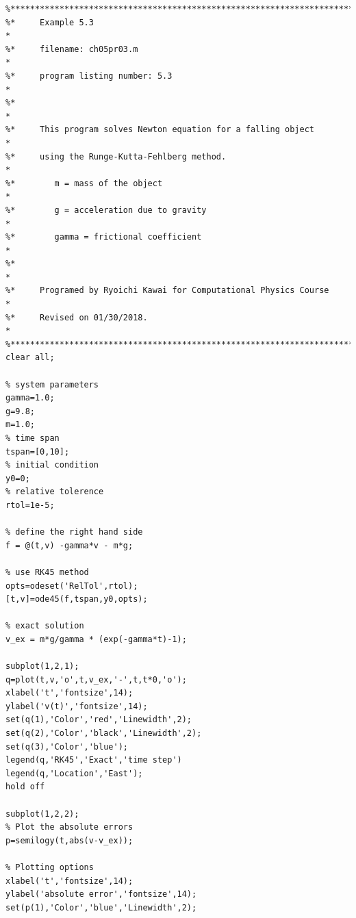 
\bigskip
\noindent
\program
\label{prog:freefalling3}

\footnotesize
\begin{verbatim}
%**************************************************************************
%*     Example 5.3                                                        *
%*     filename: ch05pr03.m                                               *
%*     program listing number: 5.3                                        *
%*                                                                        *
%*     This program solves Newton equation for a falling object           *
%*     using the Runge-Kutta-Fehlberg method.                             *
%*        m = mass of the object                                          *
%*        g = acceleration due to gravity                                 *
%*        gamma = frictional coefficient                                  *
%*                                                                        *
%*     Programed by Ryoichi Kawai for Computational Physics Course        *
%*     Revised on 01/30/2018.                                             *
%**************************************************************************
clear all;

% system parameters
gamma=1.0;
g=9.8;
m=1.0;
% time span
tspan=[0,10]; 
% initial condition
y0=0;
% relative tolerence
rtol=1e-5;

% define the right hand side
f = @(t,v) -gamma*v - m*g;

% use RK45 method
opts=odeset('RelTol',rtol);
[t,v]=ode45(f,tspan,y0,opts);

% exact solution
v_ex = m*g/gamma * (exp(-gamma*t)-1);

subplot(1,2,1);
q=plot(t,v,'o',t,v_ex,'-',t,t*0,'o');
xlabel('t','fontsize',14);
ylabel('v(t)','fontsize',14);
set(q(1),'Color','red','Linewidth',2);
set(q(2),'Color','black','Linewidth',2);
set(q(3),'Color','blue');
legend(q,'RK45','Exact','time step')
legend(q,'Location','East');
hold off

subplot(1,2,2);
% Plot the absolute errors
p=semilogy(t,abs(v-v_ex));

% Plotting options
xlabel('t','fontsize',14);
ylabel('absolute error','fontsize',14);
set(p(1),'Color','blue','Linewidth',2);
\end{verbatim}
\normalsize
{}

\bigskip
\noindent
\program
\label{prog:twocars}

